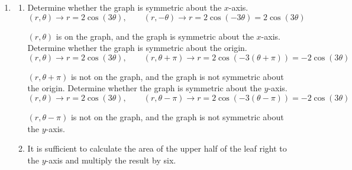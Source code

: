 \documentclass[a4paper, 12pt]{article}
\begin{document}
\begin{enumerate}[leftmargin=*,label=\textbf{\arabic*.}]
\item \begin{enumerate}[leftmargin=*,label=\textbf{\alph*.}]
\item Determine whether the graph is symmetric about the $x$-axis.
\[(r,\theta)\rightarrow r=2\cos(3\theta),\qquad (r,-\theta)\rightarrow r=2\cos(-3\theta)=2\cos(3\theta)\]

$(r,\theta)$ is on the graph, and the graph is symmetric about the $x$-axis. Determine whether the graph is symmetric about the origin.
\[(r,\theta)\rightarrow r=2\cos(3\theta),\qquad (r,\theta+\pi)\rightarrow r=2\cos(-3(\theta+\pi))=-2\cos(3\theta)\]

$(r,\theta+\pi)$ is not on the graph, and the graph is not symmetric about the origin. Determine whether the graph is symmetric about the $y$-axis.
\[(r,\theta)\rightarrow r=2\cos(3\theta),\qquad (r,\theta-\pi)\rightarrow r=2\cos(-3(\theta-\pi))=-2\cos(3\theta)\]

$(r,\theta-\pi)$ is not on the graph, and the graph is not symmetric about the $y$-axis. 

\begin{center}
\end{center}

\item It is sufficient to calculate the area of the upper half of the leaf right to the $y$-axis and multiply the result by six.

\begin{center}
\end{center}
\end{enumerate}
\end{enumerate}
\end{document}

